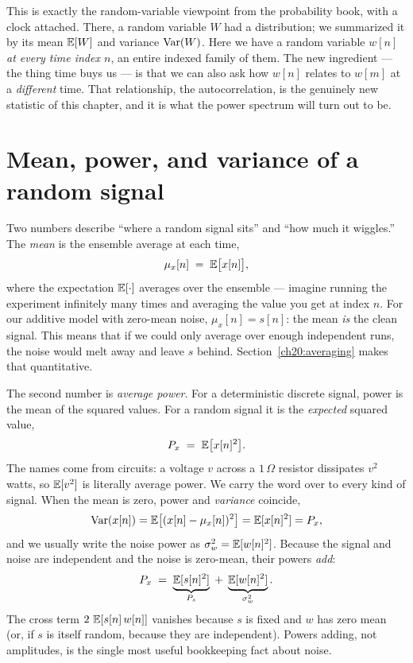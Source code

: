 \begin{connectionbox}
This is exactly the random-variable viewpoint from the probability book, with a
clock attached. There, a random variable $W$ had a distribution; we summarized
it by its mean $\operatorname{\mathbb{E}}[W]$ and variance $\operatorname{Var}(W)$. Here we have a random variable
$w[n]$ \emph{at every time index $n$}, an entire indexed family of them. The new
ingredient --- the thing time buys us --- is that we can also ask how
$w[n]$ relates to $w[m]$ at a \emph{different} time. That relationship, the
autocorrelation, is the genuinely new statistic of this chapter, and it is what
the power spectrum will turn out to be.
\end{connectionbox}

\section{Mean, power, and variance of a random signal}
\label{ch20:mean-power}

Two numbers describe ``where a random signal sits'' and ``how much it wiggles.''
The \emph{mean} is the ensemble average at each time,
\begin{equation}
  \mu_x[n] \;=\; \operatorname{\mathbb{E}}\bigl[x[n]\bigr],
  \label{ch20:mean}
\end{equation}
where the expectation $\operatorname{\mathbb{E}}[\cdot]$ averages over the ensemble --- imagine running
the experiment infinitely many times and averaging the value you get at index
$n$. For our additive model with zero-mean noise, $\mu_x[n] = s[n]$: the mean
\emph{is} the clean signal. This means that if
we could only average over enough independent runs, the noise would melt away and
leave $s$ behind. Section~\ref{ch20:averaging} makes that quantitative.

The second number is \emph{average power}. For a deterministic discrete signal,
power is the mean of the squared values. For a random signal it is the
\emph{expected} squared value,
\begin{equation}
  P_x \;=\; \operatorname{\mathbb{E}}\bigl[x[n]^2\bigr].
  \label{ch20:power}
\end{equation}
The names come from circuits: a voltage $v$ across a $1\,\Omega$ resistor
dissipates $v^2$ watts, so $\operatorname{\mathbb{E}}[v^2]$ is literally average power. We carry the
word over to every kind of signal. When the mean is zero, power and
\emph{variance} coincide,
\[
  \operatorname{Var}(x[n]) = \operatorname{\mathbb{E}}\!\left[(x[n]-\mu_x[n])^2\right] = \operatorname{\mathbb{E}}[x[n]^2] = P_x,
\]
and we usually write the noise power as $\sigma_w^2 = \operatorname{\mathbb{E}}[w[n]^2]$. Because the
signal and noise are independent and the noise is zero-mean, their powers
\emph{add}:
\begin{equation}
  P_x \;=\; \underbrace{\operatorname{\mathbb{E}}[s[n]^2]}_{P_s} \;+\; \underbrace{\operatorname{\mathbb{E}}[w[n]^2]}_{\sigma_w^2}.
  \label{ch20:power-add}
\end{equation}
The cross term $2\,\operatorname{\mathbb{E}}[s[n]\,w[n]]$ vanishes because $s$ is fixed and $w$ has zero
mean (or, if $s$ is itself random, because they are independent). Powers adding,
not amplitudes, is the single most useful bookkeeping fact about noise.

